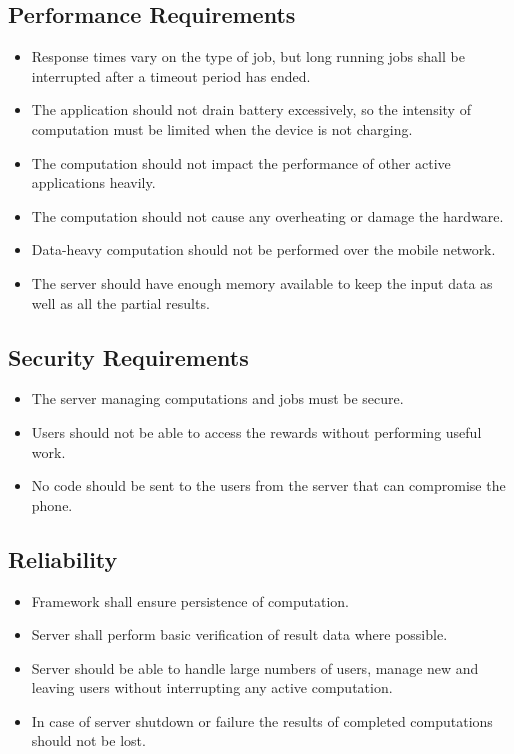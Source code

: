 \documentclass[a4paper,10pt]{article}
\begin{document}
\subsection{Performance Requirements}

\begin{itemize}
	\item Response times vary on the type of job, but long running jobs shall be interrupted after a timeout period has ended.
	\item The application should not drain battery excessively, so the intensity of computation must be limited when the device is not charging.
	\item The computation should not impact the performance of other active applications heavily.
	\item The computation should not cause any overheating or damage the hardware.
	\item Data-heavy computation should not be performed over the mobile network.
	\item The server should have enough memory available to keep the input data as well as all the partial results.
\end{itemize} 

\subsection{Security Requirements}

\begin{itemize}
	\item The server managing computations and jobs must be secure.
	\item Users should not be able to access the rewards without performing useful work.
	\item No code should be sent to the users from the server that can compromise the phone.
\end{itemize} 

\subsection{Reliability}

\begin{itemize}
	\item Framework shall ensure persistence of computation.
	\item Server shall perform basic verification of result data where possible.
	\item Server should be able to handle large numbers of users, manage new and leaving users without interrupting any active computation.
	\item In case of server shutdown or failure the results of completed computations should not be lost.
\end{itemize} 
\end{document}
